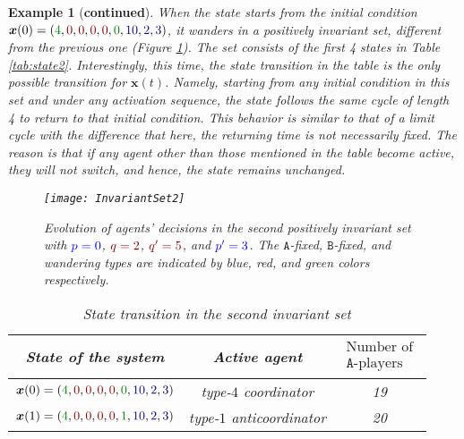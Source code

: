 \documentclass[10 pt,twocolumn,journal]{IEEEtran}
\theoremstyle{plain}
\newtheorem{example}{Example}[] %
\newcommand{\A}{\mathcal{A}}
\newcommand{\x}{\bm{x}}
\newcommand{\p}{\tb{p}}
\newcommand{\pp}{\tb{p'}}
\newcommand{\q}{\tr{q}}
\newcommand{\qq}{\tr{q'}}
\renewcommand{\A}{\mathtt{A}}
\newcommand{\B}{\mathtt{B}}
\newcommand{\tb}{\textcolor{blue}}
\newcommand{\tr}{\textcolor{Myred}}
\theoremstyle{definition}
\begin{document}
\begin{example}[\textbf{continued}]
    When the state starts from the initial condition $\x(0)=({\color{Mygreen}4}, {\color{Myred}0}, {\color{Myred}0}, {\color{Myred}0}, {\color{Myred}0}, {\color{Mygreen}0}, {\color{Myblue}10}, {\color{Myblue}2}, {\color{Myblue}3})$,
    it wanders in a positively invariant set, different from the previous one (Figure \ref{fig:InvariantSet2}).  
    The set consists of the first 4 states in Table \ref{tab:state2}.
    Interestingly, this time, the state transition in the table is the only possible transition for $\x(t)$. 
    Namely, starting from any initial condition in this set and under any activation sequence, the state follows the same cycle of length 4 to return to that initial condition.
    This behavior is similar to that of a limit cycle with the difference that here, the returning time is not necessarily fixed.
    The reason is that if any agent other than those mentioned in the table become active, they will not switch, and hence, the state remains unchanged. 
\begin{figure}[ht]
	\centering	\texttt{[image: InvariantSet2]}
    \caption{Evolution of agents' decisions in the second positively invariant set with $\tb{\p=0}$, $\tr{\q=2}$, $\tr{\qq=5}$, and $\tb{\pp=3}$.
    The $\A$-fixed, $\B$-fixed, and wandering types are indicated by blue, red, and green colors respectively.}
	\label{fig:InvariantSet2}
\end{figure}
\begin{table}[ht]
  \begin{center}
  \caption{State transition in the second invariant set}
    \begin{tabular}{|c|c|c|}
		\hline 
		State of the system & Active agent & $\begin{matrix} \text{Number of} \\ \text{$\A$-players}\end{matrix}$ \\ 
		\hline 
		\cellcolor{MyLightYellow}$\x(0)=({\color{Mygreen}4}, {\color{Myred}0}, {\color{Myred}0}, {\color{Myred}0}, {\color{Myred}0}, {\color{Mygreen}0}, {\color{Myblue}10}, {\color{Myblue}2}, {\color{Myblue}3})$ &   type-$4$ coordinator & 19 \\ 
        $\x(1)=({\color{Mygreen}4}, {\color{Myred}0}, {\color{Myred}0}, {\color{Myred}0}, {\color{Myred}0}, {\color{Mygreen}1}, {\color{Myblue}10}, {\color{Myblue}2}, {\color{Myblue}3})$ &  type-$1$ anticoordinator & 20 \\ 

\end{tabular}
\end{center}
\end{table}
\end{example}
\end{document}
